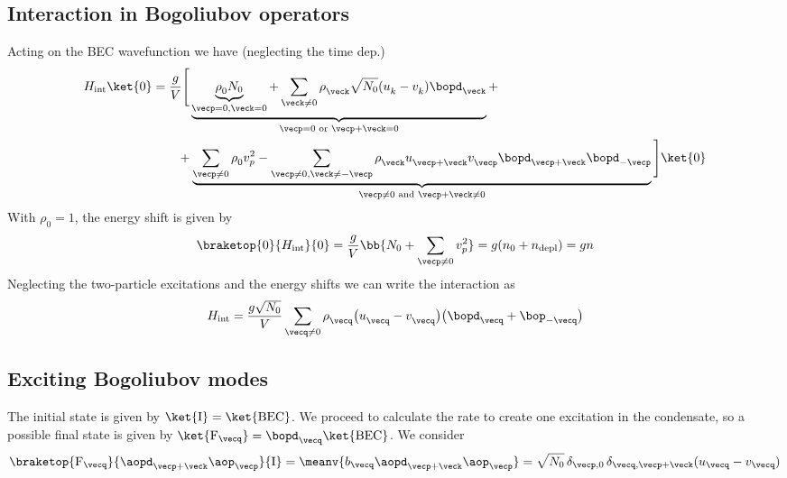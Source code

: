 \subsection{Interaction in Bogoliubov operators}
Acting on the BEC wavefunction we have (neglecting the time dep.)
\begin{align}
H_\text{int} \ket{0} &= \frac{g}{V} \Bigg[ \underbrace{\underbrace{\rhoz N_0}_{\vecp=0,\veck=0} +\sum_{\veck\ne 0} \rhok\sqrt{N_0} (\bogu_k-\bogv_k) \bopd_{\veck}}_{\vecp=0 \text{ or } \vecp+\veck=0} +\\
&\qquad+ \underbrace{\sum_{\vecp\ne 0} \rhoz v_p^2-\sum_{\vecp\ne 0,\veck\ne -\vecp} \rhok \bogu_{\vecp+\veck}\bogv_{\vecp} \bopd_{\vecp+\veck}\bopd_{-\vecp}}_{\vecp\ne 0 \text{ and }\vecp+\veck\ne 0} \Bigg] \ket{0}
\end{align}
With $\rho_0=1$, the energy shift is given by
\begin{align}
\braketop{0}{H_\text{int}}{0} = \frac{g}{V} \bb{N_0 + \sum_{\vecp\ne 0} v_p^2} = g (n_0 + n_\text{depl}) = g n
\end{align}
Neglecting the two-particle excitations and the energy shifts we can write the interaction as
\begin{align}
H_\text{int}=\frac{g\sqrt{N_0}}{V} \sum_{\vecq\ne 0} \rho^{\phantom\dagger}_{\vecq} \big(\bogu_{\vecq}-\bogv_{\vecq}\big) \big(\bopd_{\vecq}+\bop_{-\vecq}\big)
\end{align}

\subsection{Exciting Bogoliubov modes}
The initial state is given by $\ket{\text{I}}=\ket{\text{BEC}}$. We proceed to calculate the rate to create one excitation in the condensate, so a possible final state is given by $\ket{\text{F}_{\vecq}} = \bopd_{\vecq}\ket{\text{BEC}}$. We consider
\begin{align}
\braketop{\text{F}_{\vecq}}{\aopd_{\vecp+\veck} \aop_{\vecp}}{\text{I}} = \meanv{b_{\vecq} \aopd_{\vecp+\veck} \aop_{\vecp}}= \sqrt{N_0} \,\delta_{\vecp,0} \, \delta_{\vecq,\vecp+\veck} (u_{\vecq}-v_{\vecq})
\end{align}

